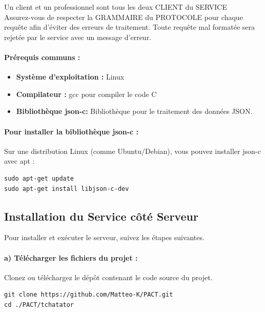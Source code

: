 \documentclass{report}
\begin{document}
Un client et un professionnel sont tous les deux CLIENT du SERVICE \\

Assurez-vous de respecter la GRAMMAIRE du  PROTOCOLE pour chaque requête afin d'éviter des erreurs de traitement. Toute requête mal formatée sera rejetée par le service avec un message d'erreur.

\paragraph{Prérequis communs :}
\begin{itemize}

	\item \textbf{Système d'exploitation :}  Linux
	\item \textbf{Compilateur :}  gcc pour compiler le code C
	\item \textbf{Bibliothèque json-c:} Bibliothèque pour le traitement des données JSON.

\end{itemize}

\paragraph{Pour installer la bibliothèque json-c :}

Sur une distribution Linux (comme Ubuntu/Debian), vous pouvez installer json-c avec apt :

\begin{verbatim}
sudo apt-get update
sudo apt-get install libjson-c-dev
\end{verbatim}

\subsection{Installation du Service côté Serveur}

Pour installer et exécuter le serveur, suivez les étapes suivantes.

\paragraph{a) Télécharger les fichiers du projet :}

Clonez ou téléchargez le dépôt contenant le code source du projet.

\begin{verbatim}
git clone https://github.com/Matteo-K/PACT.git
cd ./PACT/tchatator
\end{verbatim}
\end{document}

